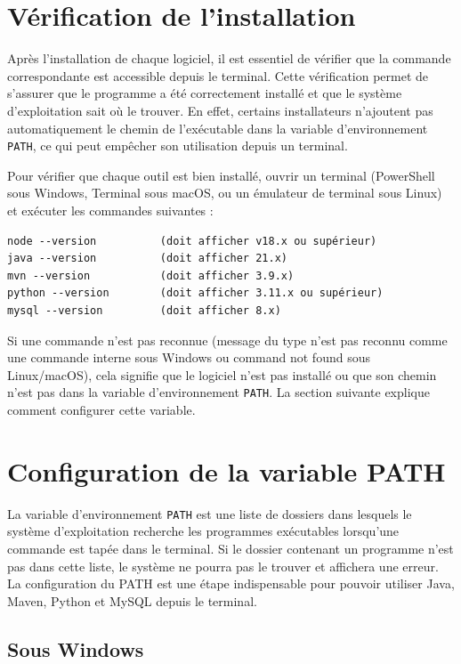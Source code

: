 \documentclass[12pt,a4paper]{report}
\begin{document}
\section{Vérification de l'installation}

Après l'installation de chaque logiciel, il est essentiel de vérifier que la commande correspondante est accessible depuis le terminal. Cette vérification permet de s'assurer que le programme a été correctement installé et que le système d'exploitation sait où le trouver. En effet, certains installateurs n'ajoutent pas automatiquement le chemin de l'exécutable dans la variable d'environnement \texttt{PATH}, ce qui peut empêcher son utilisation depuis un terminal.

Pour vérifier que chaque outil est bien installé, ouvrir un terminal (PowerShell sous Windows, Terminal sous macOS, ou un émulateur de terminal sous Linux) et exécuter les commandes suivantes :

\begin{verbatim}
node --version          (doit afficher v18.x ou supérieur)
java --version          (doit afficher 21.x)
mvn --version           (doit afficher 3.9.x)
python --version        (doit afficher 3.11.x ou supérieur)
mysql --version         (doit afficher 8.x)
\end{verbatim}

Si une commande n'est pas reconnue (message du type \og n'est pas reconnu comme une commande interne \fg{} sous Windows ou \og command not found \fg{} sous Linux/macOS), cela signifie que le logiciel n'est pas installé ou que son chemin n'est pas dans la variable d'environnement \texttt{PATH}. La section suivante explique comment configurer cette variable.

\section{Configuration de la variable PATH}

La variable d'environnement \texttt{PATH} est une liste de dossiers dans lesquels le système d'exploitation recherche les programmes exécutables lorsqu'une commande est tapée dans le terminal. Si le dossier contenant un programme n'est pas dans cette liste, le système ne pourra pas le trouver et affichera une erreur. La configuration du PATH est une étape indispensable pour pouvoir utiliser Java, Maven, Python et MySQL depuis le terminal.

\subsection{Sous Windows}
\end{document}

